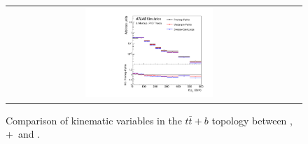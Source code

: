 \begin{figure}[p]
\begin{center}
\begin{tabular}{cc}
\includegraphics[width=0.46\textwidth]{Modeling/Figures/default_tt1bq_ttbar_pt_norm} \\
\end{tabular}
\caption{Comparison of kinematic variables in the $t\bar{t}+b$ topology between \PP, \madgraph+\pythia\ and \ShOL.}
\label{fig:default_tt1b}
\end{center}
\end{figure}
